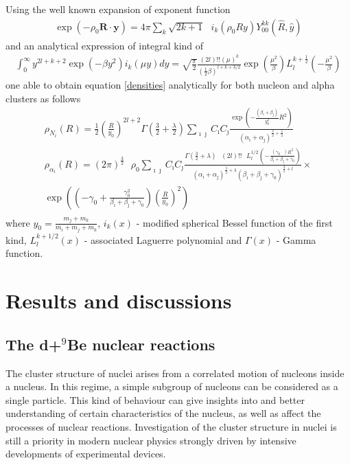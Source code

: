 \documentclass[
11pt, %
english, %
onehalfspacing, %
headsepline, %
]{MastersDoctoralThesis} %
\begin{document}
 Using the well known expansion of exponent function
\begin{align*}
\exp(-\rho_0 \textbf{R} \cdot \textbf{y} )=
4 \pi \sum_k \sqrt{2k+1} \text{ } i_k(\rho_0 R y) Y^{kk}_{00} \left( \widehat{R},\widehat{y} \right)
\end{align*}
and an analytical expression of integral kind of
\begin{align*}
\int_0^\infty y^{2l+k+2}\exp(-\beta y^2)i_k(\mu y) dy=
\sqrt{\frac{\pi}{2}} \frac{   (2l)!!   (\mu)^k}{   \left( \frac{1}{2}\beta \right)^{l+k+3/2}   }
\exp \left( \frac{\mu^2}{\beta} \right) L^{k+\frac{1}{2}}_{l}   \left( -\frac{\mu^2}{\beta} \right)
\end{align*}
one able to obtain equation \eqref{densities}  analytically for both nucleon and alpha clusters as follows
\begin{equation}
\begin{gathered}
 \rho_{N_i}({R})=  
 \frac{1}{2}  
 \left( \frac{R}{y_0} \right)^{2l+2}
 \Gamma \left( \frac{3}{2}+\frac{\lambda}{2} \right)
 \sum_{{\imath}{\jmath}} C_{\imath} C_{\jmath}
 \frac{ \exp  \left( - \frac{ \left(  \beta_{\imath} + \beta_{\jmath}  \right)}{y_0^2} R^2 \right) }
 		{   \left( \alpha_{\imath}+\alpha_{\jmath} \right)^{\frac{3}{2}+\frac{\lambda}{2}} } 
   \\
   \rho_{\alpha_i}({R})= 
(2 \pi)^{\frac{3}{2}}  \text{ }  \rho_0
\sum_{\imath \jmath} C_{\imath} C_{\jmath}
 \frac{\Gamma \left( \frac{3}{2}+\lambda \right) \text{ }    (2l)!! \text{ }   L^{ 1/2}_l \left( -\frac{\left(\gamma_0 \text{ } \right) R^2}{\beta_{\imath} + \beta_{\jmath} + \gamma_0} \right)  } 
 	{ \left( \alpha_{\imath}+\alpha_{\jmath} \right)^{\frac{3}{2} + \lambda }  \left(  \beta_{\imath} + \beta_{\jmath} + \gamma_0 \right)^{\frac{3}{2}+l}}  \times \\
 	\exp \left( \left( -\gamma_0 + \frac{\gamma_0^2}{\beta_{\imath} + \beta_{\jmath} + \gamma_0} \right) \left( \frac{R}{y_0} \right)^2 \right) \\
 \end{gathered} 
\end{equation}
where $y_0=\frac{m_j+m_k}{m_i+m_j+m_k}$, $ i_k(x)$ - modified spherical Bessel function  of the first kind, $L_{l}^{k+1/2}(x)$ - associated Laguerre polynomial and $\Gamma (x)$ - Gamma function.


\chapter{Results and discussions}
\section{The d+$^9$Be nuclear reactions}
The cluster structure of nuclei arises from a correlated motion of nucleons inside a nucleus. In this regime, a simple subgroup of nucleons can be considered as a single particle.
This kind of behaviour can give insights into and better understanding of certain characteristics of the nucleus, as well as affect the processes of nuclear reactions. 
Investigation  of the cluster structure in nuclei is still a priority in modern nuclear physics strongly driven by intensive developments of experimental devices.\\
\end{document}
